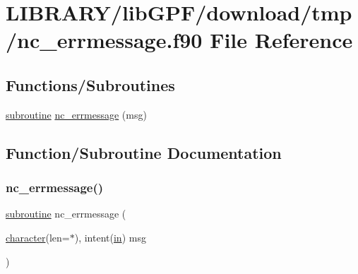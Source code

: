 \hypertarget{nc__errmessage_8f90}{}\section{L\+I\+B\+R\+A\+R\+Y/lib\+G\+P\+F/download/tmp/nc\+\_\+errmessage.f90 File Reference}
\label{nc__errmessage_8f90}
\subsection*{Functions/\+Subroutines}
\begin{DoxyCompactItemize}
\item 
\hyperlink{M__stopwatch_83_8txt_acfbcff50169d691ff02d4a123ed70482}{subroutine} \hyperlink{nc__errmessage_8f90_ade6780c0b4bcaa3cecf07e3a5bcbeeee}{nc\+\_\+errmessage} (msg)
\end{DoxyCompactItemize}


\subsection{Function/\+Subroutine Documentation}
\mbox{\label{nc__errmessage_8f90_ade6780c0b4bcaa3cecf07e3a5bcbeeee}} 
\subsubsection{\texorpdfstring{nc\+\_\+errmessage()}{nc\_errmessage()}}
{\footnotesize\ttfamily \hyperlink{M__stopwatch_83_8txt_acfbcff50169d691ff02d4a123ed70482}{subroutine} nc\+\_\+errmessage (\begin{DoxyParamCaption}\item[{\hyperlink{option__stopwatch_83_8txt_abd4b21fbbd175834027b5224bfe97e66}{character}(len=$\ast$), intent(\hyperlink{M__journal_83_8txt_afce72651d1eed785a2132bee863b2f38}{in})}]{msg }\end{DoxyParamCaption})}

